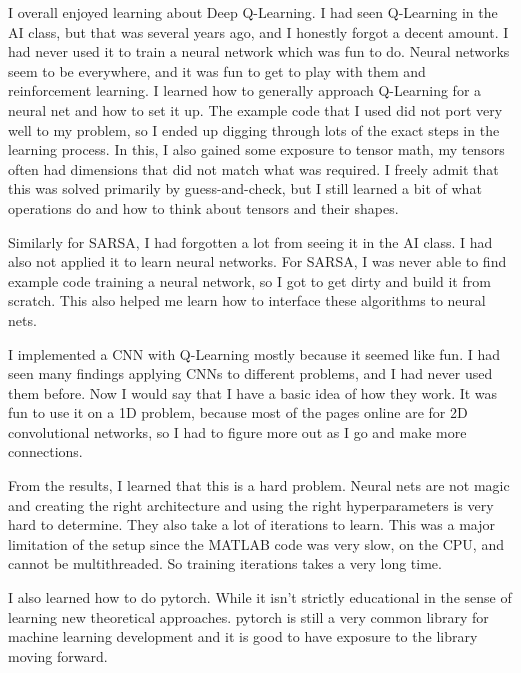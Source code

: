 \documentclass[11pt]{article}
\begin{document}
I overall enjoyed learning about Deep Q-Learning.
I had seen Q-Learning in the AI class, but that was several years ago, and I honestly forgot a decent amount.
I had never used it to train a neural network which was fun to do. 
Neural networks seem to be everywhere, and it was fun to get to play with them and reinforcement learning. 
I learned how to generally approach Q-Learning for a neural net and how to set it up.
The example code that I used did not port very well to my problem, so I ended up digging through lots of the exact steps in the learning process.
In this, I also gained some exposure to tensor math, my tensors often had dimensions that did not match what was required.
I freely admit that this was solved primarily by guess-and-check, but I still learned a bit of what operations do and how to think about tensors and their shapes. 

Similarly for SARSA, I had forgotten a lot from seeing it in the AI class. 
I had also not applied it to learn neural networks.
For SARSA, I was never able to find example code training a neural network, so I got to get dirty and build it from scratch.
This also helped me learn how to interface these algorithms to neural nets. 

I implemented a CNN with Q-Learning mostly because it seemed like fun.
I had seen many findings applying CNNs to different problems, and I had never used them before.
Now I would say that I have a basic idea of how they work. 
It was fun to use it on a 1D problem, because most of the pages online are for 2D convolutional networks, 
so I had to figure more out as I go and make more connections.

From the results, I learned that this is a hard problem. Neural nets are not magic and creating the right architecture and using the right hyperparameters 
is very hard to determine. 
They also take a lot of iterations to learn. This was a major limitation of the setup since the MATLAB code was very slow, on the CPU, and cannot be multithreaded.
So training iterations takes a very long time. 

I also learned how to do pytorch. While it isn't strictly educational in the sense of learning new theoretical approaches.
pytorch is still a very common library for machine learning development and it is good to have exposure to the library moving forward.
\end{document}

